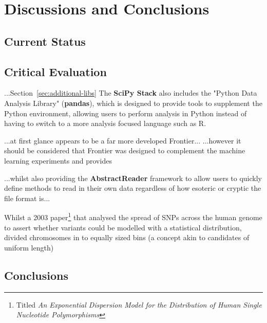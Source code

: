 \part{Discussions and Conclusions}
\chapter{Current Status}

\chapter{Critical Evaluation}

...Section~\ref{sec:additional-libs}
The \textbf{SciPy Stack} also includes the "Python Data Analysis Library"
(\textbf{pandas}), which is designed to provide tools to supplement the Python
environment, allowing users to perform analysis in Python instead of having to
switch to a more analysis focused language such as R.

...at first glance appears to be a far more developed Frontier...
...however it should be considered that Frontier was designed to complement the
machine learning experiments and provides 

...whilst also providing the \textbf{AbstractReader} framework to allow users to
quickly define methods to read in their own data regardless of how esoteric or
cryptic the file format is...


Whilst a 2003 paper\citep{kendal2003exponential}\footnote{Titled \textit{An Exponential
Dispersion Model for the Distribution of Human Single Nucleotide
Polymorphisms}\citep{kendal2003exponential}} that analysed the spread of SNPs
across the human genome to assert whether variants could be modelled with a
statistical distribution, divided chromosomes in to equally sized bins (a
concept akin to candidates of uniform length)

\chapter{Conclusions}


